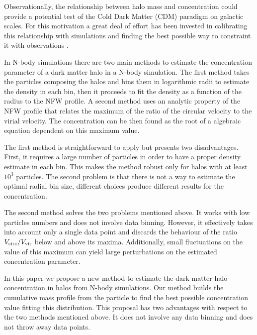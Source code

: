 \documentclass[a4,useAMS,usenatbib,usegraphicx]{mn2e}
\begin{document}
Observationally, the relationship between halo mass and concentration
could provide a potential test of the Cold Dark Matter (CDM) paradigm
on galactic scales. 
For this motivation a great deal of effort has been
invested in calibrating this relationship with simulations
\citep{Neto2007,Duffy2008,Munoz2011,Prada2012,Ludlow2014} and 
finding the best possible way to constraint it with observations
\citep{Buote2007,Comerford2007,Mandelbaum2008,Giocoli2014,Foex2014,Shan2015}.  


In N-body simulations there are two main methods to estimate the
concentration parameter of a dark matter halo in a N-body simulation.
The first method takes the particles composing the halos
and bins them in logarithmic radii to estimate the density in each
bin, then it proceeds to fit the density as a function of the radius
to the NFW profile.
A second method uses an analytic property of the
NFW profile that relates the maximum of the ratio of the circular velocity to
the virial velocity.
The concentration can be then found as the root of a algebraic 
equation dependent on this maximum value.


The first method is straightforward to apply but presents two
disadvantages.
First, it requires a large number of particles in
order to have a proper density estimate in each bin.
This makes the method robust only for halos with at least  $10^3$
particles.
The second problem is that there is not a way to estimate the optimal
radial bin size, different choices produce different results for the
concentration. 

The second method solves the two problems mentioned above.
It works with low particles numbers and does not involve data
binning.
However, it effectively takes into account only a single data point
and discards the behaviour of the ratio $V_{\rm circ}/V_{\rm vir}$ below and
above its maxima.
Additionally, small fluctuations on the value of this maximum can
yield large perturbations on the estimated concentration parameter.

In this paper we propose a new method to estimate the dark matter halo
concentration in halos from N-body simulations.
Our method builds the cumulative mass profile from the particle
to find the best possible concentration value fitting this
distribution. 
This proposal has two advantages with respect to the two methods mentioned
above. 
It does not involve any data binning and does not throw away data points.







\end{document}
